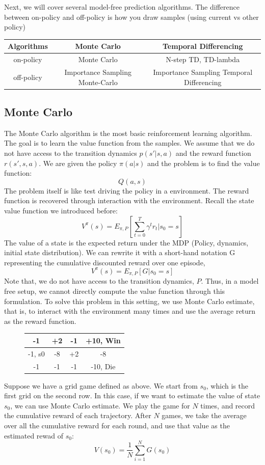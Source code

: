 \documentclass[11pt]{article}
\begin{document}
Next, we will cover several model-free prediction algorithms. The difference between on-policy and off-policy is how you draw samples (using current vs other policy)
\begin{center}
\begin{tabular}{ |c|c|c| }
 \hline
 Algorithms & Monte Carlo & Temporal Differencing \\
 \hline\hline
 on-policy & Monte Carlo & N-step TD, TD-lambda \\  
 \hline
 off-policy & Importance Sampling Monte-Carlo & Importance Sampling
Temporal Differencing \\
 \hline
\end{tabular}
\end{center}

\subsection{Monte Carlo}
The Monte Carlo algorithm is the most basic reinforcement learning algorithm. The goal is to learn the value function from the samples. We assume that we do not have access to the transition dynamics \(p(s' | s, a)\) and the reward function \(r(s', s, a)\). We are given the policy \(\pi(a|s)\) and the problem is to find the value function:
\[Q(a, s)\]
The problem itself is like test driving the policy in a environment. The reward function is recovered through interaction with the environment. Recall the state value function we introduced before:
\[V^{\pi}(s) = E_{\pi, P} [\sum_{t=0}^T \gamma^t r_t | s_0=s]\]
The value of a state is the expected return under the MDP (Policy, dynamics, initial state distribution). We can rewrite it with a short-hand notation G representing the cumulative discounted reward over one episode, 
\[V^{\pi}(s) = E_{\pi, P} [G | s_0=s]\]
Note that, we do not have access to the transition dynamics, \(P\). Thus, in a model free setup, we cannot directly compute the value function through this formulation. To solve this problem in this setting, we use Monte Carlo estimate, that is, to interact with the environment many times and use the average return as the reward function.
\begin{figure}[h]
\centering
\begin{tabular}{| c | c | c | c |}
\hline
-1 & +2 & -1 & +10, Win \\
\hline
-1, s0 & -8 & +2 & -8 \\
\hline
-1 & -1 & -1 & -10, Die \\
\hline
\end{tabular}
\end{figure}
Suppose we have a grid game defined as above. We start from \(s_0\), which is the first grid on the second row. In this case, if we want to estimate the value of state \(s_0\), we can use Monte Carlo estimate. We play the game for \(N\) times, and record the cumulative reward of each trajectory. After \(N\) games, we take the average over all the cumulative reward for each round, and use that value as the estimated rewad of \(s_0\):
\[V(s_0) = \dfrac{1}{N} \sum_{i=1}^N G(s_0)\]
\end{document}

